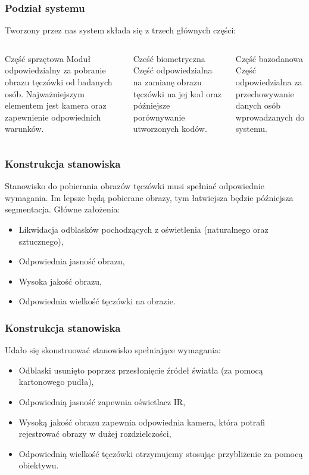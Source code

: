 \documentclass{beamer}
\begin{document}

\begin{frame}
\frametitle{Podział systemu}

Tworzony przez nas system składa się z trzech głównych części:
\begin{columns}[t]
\begin{block}{Część sprzętowa}
Moduł odpowiedzialny za pobranie obrazu tęczówki od badanych osób. Najważniejszym elementem jest kamera oraz zapewnienie odpowiednich warunków.
\end{block}
\begin{block}{Cześć biometryczna}
Część odpowiedzialna na zamianę obrazu tęczówki na jej kod oraz późniejsze porównywanie utworzonych kodów.
\end{block}
\begin{block}{Część bazodanowa}
Część odpowiedzialna za przechowywanie danych osób wprowadzanych do systemu.
\end{block}
\end{columns} 

\end{frame}


\begin{frame}
\frametitle{Konstrukcja stanowiska}
Stanowisko do pobierania obrazów tęczówki musi spełniać odpowiednie wymagania. Im lepsze będą pobierane obrazy, tym łatwiejsza będzie późniejsza segmentacja. Główne założenia:
\begin{itemize}
\item Likwidacja odblasków pochodzących z oświetlenia (naturalnego oraz sztucznego),
\item Odpowiednia jasność obrazu,
\item Wysoka jakość obrazu,
\item Odpowiednia wielkość tęczówki na obrazie.
\end{itemize}
\end{frame}

\begin{frame}
\frametitle{Konstrukcja stanowiska}
Udało się skonstruować stanowisko spełniające wymagania:
\begin{itemize}
\item Odblaski usunięto poprzez przesłonięcie źródeł światła (za pomocą kartonowego pudła),
\item Odpowiednią jasność zapewnia oświetlacz IR,
\item Wysoką jakość obrazu zapewnia odpowiednia kamera, która potrafi rejestrować obrazy w dużej rozdzielczości,
\item Odpowiednią wielkość tęczówki otrzymujemy stosując przybliżenie za pomocą obiektywu.
\end{itemize}
\end{frame}
\end{document}
